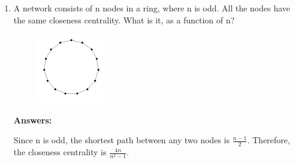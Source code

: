 \documentclass{amsart}
\theoremstyle{definition}
\theoremstyle{remark}
\numberwithin{equation}{section}
\begin{document}
\begin{enumerate}
\begin{enumerate}
The python code output: \vspace{0.2cm}

{0: 0.6666666666666666, 1: 0.6666666666666666, 2: 0.6666666666666666, 3: 0.6666666666666666}


\vspace{0.2cm}
\end{enumerate}
\clearpage

\item A network consists of n nodes in a ring, where n is odd. All the nodes have the same closeness centrality. What is it, as a function of n? \vspace{0.2cm}


\begin{figure}[h]
\includegraphics[width=0.2\linewidth]{images/hw3_figure1.PNG}
\end{figure}

\vspace{0.2cm}

\textbf{Answers:}

\vspace{0.2cm}

Since n is odd, the shortest path between any two nodes is $\frac{n-1}{2}$. Therefore, the closeness centrality is $\frac{4n}{n^2-1}$.


\vspace{0.2cm}


\end{enumerate}
\end{document}
